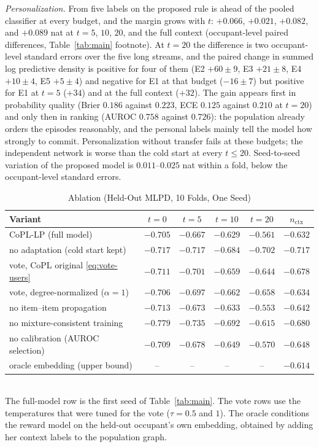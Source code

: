 \documentclass[conference]{IEEEtran}
\newcommand{\method}{CoPL-LP}
\begin{document}
\emph{Personalization.} From five labels on the proposed rule is ahead of the pooled classifier at every budget, and the margin grows with $t$: $+0.066$, $+0.021$, $+0.082$, and $+0.089$ nat at $t=5$, $10$, $20$, and the full context (occupant-level paired differences, Table~\ref{tab:main} footnote). At $t=20$ the difference is two occupant-level standard errors over the five long streams, and the paired change in summed log predictive density is positive for four of them (E2 $+60\pm9$, E3 $+21\pm8$, E4 $+10\pm4$, E5 $+5\pm4$) and negative for E1 at that budget ($-16\pm7$) but positive for E1 at $t=5$ ($+34$) and at the full context ($+32$). The gain appears first in probability quality (Brier $0.186$ against $0.223$, ECE $0.125$ against $0.210$ at $t=20$) and only then in ranking (AUROC $0.758$ against $0.726$): the population already orders the episodes reasonably, and the personal labels mainly tell the model how strongly to commit. Personalization without transfer fails at these budgets; the independent network is worse than the cold start at every $t\le20$. Seed-to-seed variation of the proposed model is $0.011$--$0.025$ nat within a fold, below the occupant-level standard errors.

\begin{table}[t]
\caption{Ablation (Held-Out MLPD, 10 Folds, One Seed)}
\label{tab:ablation}
\centering
\setlength{\tabcolsep}{3.5pt}
\footnotesize
\begin{tabular}{lccccc}
\toprule
Variant & $t=0$ & $t=5$ & $t=10$ & $t=20$ & $n_{\mathrm{ctx}}$ \\
\midrule
\method{} (full model)              & $-0.705$ & $-0.667$ & $-0.629$ & $\mathbf{-0.561}$ & $-0.632$ \\
no adaptation (cold start kept)     & $-0.717$ & $-0.717$ & $-0.684$ & $-0.702$ & $-0.717$ \\
vote, CoPL original \eqref{eq:vote-users} & $-0.711$ & $-0.701$ & $-0.659$ & $-0.644$ & $-0.678$ \\
vote, degree-normalized ($\alpha=1$) & $-0.706$ & $-0.697$ & $-0.662$ & $-0.658$ & $-0.634$ \\
no item--item propagation           & $-0.713$ & $-0.673$ & $-0.633$ & $-0.553$ & $-0.642$ \\
no mixture-consistent training      & $-0.779$ & $-0.735$ & $-0.692$ & $-0.615$ & $-0.680$ \\
no calibration (AUROC selection)    & $-0.709$ & $-0.678$ & $-0.649$ & $-0.570$ & $-0.648$ \\
oracle embedding (upper bound)      & --       & --       & --       & --       & $-0.614$ \\
\bottomrule
\end{tabular}
\\[2pt]
{\footnotesize The full-model row is the first seed of Table~\ref{tab:main}. The vote rows use the temperatures that were tuned for the vote ($\tau=0.5$ and $1$). The oracle conditions the reward model on the held-out occupant's own embedding, obtained by adding her context labels to the population graph.}
\end{table}
\end{document}
